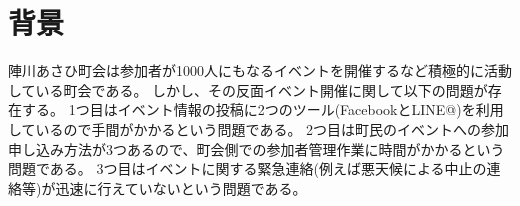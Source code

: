 \section{背景}
陣川あさひ町会は参加者が1000人にもなるイベントを開催するなど積極的に活動している町会である。
しかし、その反面イベント開催に関して以下の問題が存在する。
1つ目はイベント情報の投稿に2つのツール(FacebookとLINE@)を利用しているので手間がかかるという問題である。
2つ目は町民のイベントへの参加申し込み方法が3つあるので、町会側での参加者管理作業に時間がかかるという問題である。
3つ目はイベントに関する緊急連絡(例えば悪天候による中止の連絡等)が迅速に行えていないという問題である。
